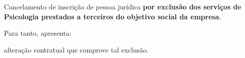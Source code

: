 \documentclass[openright, oneside, a4paper, article, brazil]{abntex2}
\begin{document}
\begin{framed}\small\raggedright
    \begin{minipage}[t]{\boxlarg}
        \raisebox{-2.2pt}{\fbox{\CheckBox[name=cancelamento_exclusao_objetivo,bordercolor=black]{\null}}}
    \end{minipage}%
    \begin{minipage}[t]{\linewidth-\boxlarg}
        Cancelamento de inscrição de pessoa jurídica \textbf{por exclusão dos serviços de  Psicologia prestados a terceiros do objetivo social da empresa}.
        \vspace{\baselineskip}

        Para tanto, apresenta:
        \vspace{\baselineskip}

        \begin{minipage}[t]{\boxlarg}
            \hfill{\null}
        \end{minipage}%
        \begin{minipage}[t]{\linewidth-\boxlarg}
%
                      \begin{minipage}[t]{\boxlarg}
                          \raisebox{-2.2pt}{\fbox{\CheckBox[name=alteracao_registrada,bordercolor=black]{\null}}}
                      \end{minipage}%
                      \begin{minipage}[t]{\linewidth-\boxlarg}
                          alteração contratual que comprove tal exclusão.
                      \end{minipage}
%
%
        \end{minipage}
    \end{minipage}
\end{framed}
\clearpage
\end{document}

